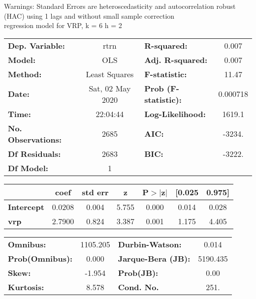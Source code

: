 Warnings: \newline
 [1] Standard Errors are heteroscedasticity and autocorrelation robust (HAC) using 1 lags and without small sample correction\\ 

regression model for VRP, k = 6 h = 2\begin{center}
\begin{tabular}{lclc}
\toprule
\textbf{Dep. Variable:}    &       rtrn       & \textbf{  R-squared:         } &     0.007   \\
\textbf{Model:}            &       OLS        & \textbf{  Adj. R-squared:    } &     0.007   \\
\textbf{Method:}           &  Least Squares   & \textbf{  F-statistic:       } &     11.47   \\
\textbf{Date:}             & Sat, 02 May 2020 & \textbf{  Prob (F-statistic):} &  0.000718   \\
\textbf{Time:}             &     22:04:44     & \textbf{  Log-Likelihood:    } &    1619.1   \\
\textbf{No. Observations:} &        2685      & \textbf{  AIC:               } &    -3234.   \\
\textbf{Df Residuals:}     &        2683      & \textbf{  BIC:               } &    -3222.   \\
\textbf{Df Model:}         &           1      & \textbf{                     } &             \\
\bottomrule
\end{tabular}
\begin{tabular}{lcccccc}
                   & \textbf{coef} & \textbf{std err} & \textbf{z} & \textbf{P$> |$z$|$} & \textbf{[0.025} & \textbf{0.975]}  \\
\midrule
\textbf{Intercept} &       0.0208  &        0.004     &     5.755  &         0.000        &        0.014    &        0.028     \\
\textbf{vrp}       &       2.7900  &        0.824     &     3.387  &         0.001        &        1.175    &        4.405     \\
\bottomrule
\end{tabular}
\begin{tabular}{lclc}
\textbf{Omnibus:}       & 1105.205 & \textbf{  Durbin-Watson:     } &    0.014  \\
\textbf{Prob(Omnibus):} &   0.000  & \textbf{  Jarque-Bera (JB):  } & 5190.435  \\
\textbf{Skew:}          &  -1.954  & \textbf{  Prob(JB):          } &     0.00  \\
\textbf{Kurtosis:}      &   8.578  & \textbf{  Cond. No.          } &     251.  \\
\bottomrule
\end{tabular}
\end{center}

